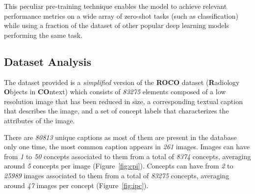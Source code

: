 \documentclass[10pt,twocolumn,letterpaper]{article}
\begin{document}
This peculiar pre-training technique enables the model to achieve relevant performance metrics on a wide array of zero-shot tasks (such as classification) while using a fraction of the dataset of other popular deep learning models performing the same task.

\subsection{Dataset Analysis}



The dataset provided is a \textit{simplified} version of the \textbf{ROCO} dataset (\textbf{R}adiology \textbf{O}bjects in \textbf{CO}ntext)\cite{roco} which consists of \textit{83275} elements composed of a low resolution image that has been reduced in size, a corresponding textual caption that describes the image, and a set of concept labels that characterizes the attributes of the image.

There are \textit{80813} unique captions as most of them are present in the database only one time, the most common caption appears in \textit{261} images.
Images can have from \textit{1} to \textit{50} concepts associated to them from a total of \textit{8374} concepts, averaging around \textit{5} concepts per image (Figure\ \ref{fig:cpi}).
Concepts can have from \textit{2} to \textit{25989} images associated to them from a total of \textit{83275} concepts, averaging around \textit{47} images per concept (Figure\ \ref{fig:ipc}).

\end{document}
